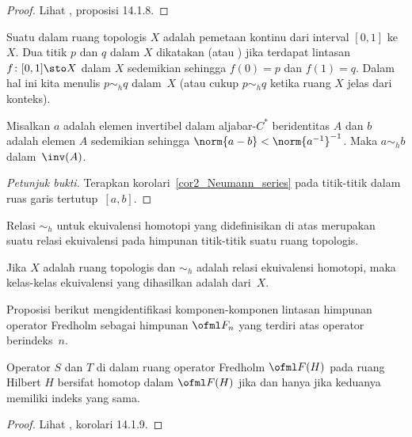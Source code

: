 \begin{proof} Lihat \cite{Wegge-Olsen:1993}, proposisi 14.1.8. \ns \end{proof}

\begin{defn}\label{004735} Suatu
 dalam ruang topologis $X$ adalah pemetaan kontinu dari interval $[0,1]$
ke~$X$. Dua titik $p$ dan $q$ dalam $X$ dikatakan
 (atau
) jika terdapat lintasan $f\colon [0,1] \sto X$ dalam $X$ sedemikian sehingga
$f(0) = p$ dan $f(1) = q$. Dalam hal ini kita
menulis $p \sim_h q$ dalam~$X$ (atau cukup $p \sim_h q$ ketika ruang $X$ jelas dari konteks).
\end{defn}


\begin{exam} Misalkan $a$ adalah elemen invertibel dalam aljabar-$C^*$ beridentitas $A$ dan $b$ adalah elemen $A$
sedemikian sehingga $\norm{a - b} < \norm{a^{-1}}^{-1}$. Maka $a \sim_h b$ dalam~$\inv(A)$.
\end{exam}

\begin{proof}[\emph{Petunjuk bukti}] Terapkan korolari~\ref{cor2_Neumann_series} pada titik-titik dalam ruas garis tertutup~$[a,b]$. \ns
\end{proof}

\begin{prop}\label{K002011} Relasi $\sim_h$ untuk ekuivalensi homotopi yang didefinisikan di atas merupakan suatu relasi
ekuivalensi pada himpunan titik-titik suatu ruang topologis.
\end{prop}

\begin{defn} Jika $X$ adalah ruang topologis dan $\sim_h$ adalah relasi ekuivalensi homotopi,
maka kelas-kelas ekuivalensi yang dihasilkan adalah
 dari~$X$.
\end{defn}

Proposisi berikut mengidentifikasi komponen-komponen lintasan himpunan operator Fredholm sebagai
himpunan $\ofml F_n$ yang terdiri atas operator berindeks~$n$.

\begin{prop} Operator $S$ dan $T$ di dalam ruang operator Fredholm $\ofml F(H)$ pada
ruang Hilbert $H$ bersifat homotop dalam $\ofml F(H)$ jika dan hanya jika keduanya memiliki indeks yang sama.
\end{prop}

\begin{proof} Lihat \cite{Wegge-Olsen:1993}, korolari 14.1.9. \ns \end{proof}







\endinput
